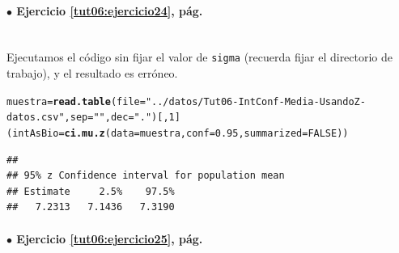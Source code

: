 \documentclass[10pt,a4paper]{article}\usepackage[]{graphicx}\usepackage[]{color}
\makeatletter
\newcommand{\hlnum}[1]{\textcolor[rgb]{0.686,0.059,0.569}{#1}}%
\newcommand{\hlstr}[1]{\textcolor[rgb]{0.192,0.494,0.8}{#1}}%
\newcommand{\hlstd}[1]{\textcolor[rgb]{0.345,0.345,0.345}{#1}}%
\newcommand{\hlkwb}[1]{\textcolor[rgb]{0.69,0.353,0.396}{#1}}%
\newcommand{\hlkwc}[1]{\textcolor[rgb]{0.333,0.667,0.333}{#1}}%
\newcommand{\hlkwd}[1]{\textcolor[rgb]{0.737,0.353,0.396}{\textbf{#1}}}%
\newenvironment{kframe}{%
 \def\at@end@of@kframe{}%
 \ifinner\ifhmode%
  \def\at@end@of@kframe{\end{minipage}}%
  \begin{minipage}{\columnwidth}%
 \fi\fi%
 \def\FrameCommand##1{\hskip\@totalleftmargin \hskip-\fboxsep
 \colorbox{shadecolor}{##1}\hskip-\fboxsep
     \hskip-\linewidth \hskip-\@totalleftmargin \hskip\columnwidth}%
 \MakeFramed {\advance\hsize-\width
   \@totalleftmargin\z@ \linewidth\hsize
   \@setminipage}}%
 {\par\unskip\endMakeFramed%
 \at@end@of@kframe}
\newenvironment{knitrout}{}{} %
\makeatother
\begin{document}
\paragraph{\bf $\bullet$ Ejercicio \ref{tut06:ejercicio24}, pág. \pageref{tut06:ejercicio24}}
\label{tut06:ejercicio24:sol}\quad\\
Ejecutamos el código sin fijar el valor de {\tt sigma} (recuerda fijar el directorio de trabajo), y el resultado es erróneo.
\begin{knitrout}
\color{fgcolor}\begin{kframe}
\begin{alltt}
\hlstd{muestra} \hlkwb{=} \hlkwd{read.table}\hlstd{(}\hlkwc{file}\hlstd{=}\hlstr{"../datos/Tut06-IntConf-Media-UsandoZ-datos.csv"}\hlstd{,} \hlkwc{sep}\hlstd{=}\hlstr{" "}\hlstd{,} \hlkwc{dec}\hlstd{=}\hlstr{"."}\hlstd{)[,}\hlnum{1}\hlstd{]}
\hlstd{(intAsBio} \hlkwb{=} \hlkwd{ci.mu.z}\hlstd{(}\hlkwc{data}\hlstd{=muestra,} \hlkwc{conf}\hlstd{=}\hlnum{0.95}\hlstd{,} \hlkwc{summarized}\hlstd{=}\hlnum{FALSE}\hlstd{))}
\end{alltt}
\begin{verbatim}
## 
## 95% z Confidence interval for population mean 
## Estimate     2.5%    97.5% 
##   7.2313   7.1436   7.3190
\end{verbatim}
\end{kframe}
\end{knitrout}


\paragraph{\bf $\bullet$ Ejercicio \ref{tut06:ejercicio25}, pág. \pageref{tut06:ejercicio25}}
\label{tut06:ejercicio25:sol}\quad\\
\end{document}
